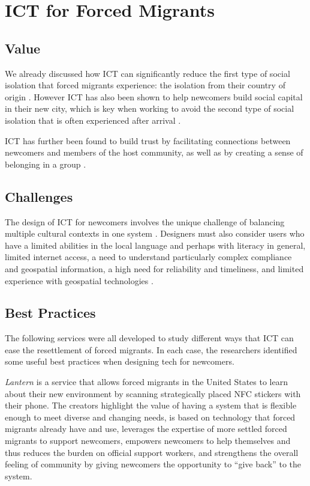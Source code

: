 \section{ICT for Forced Migrants}
\label{sec:ict}


\subsection*{Value}

We already discussed how ICT can significantly reduce the first type of social isolation that forced migrants experience: the isolation from their country of origin \cite{harney_precarity_2013}. However ICT has also been shown to help newcomers build social capital in their new city, which is key when working to avoid the second type of social isolation that is often experienced after arrival \cite{alam_digital_2015}.

ICT has further been found to build trust by facilitating connections between newcomers and members of the host community, as well as by creating a sense of belonging in a group \cite{almohamed_vulnerability_2016}.


\subsection*{Challenges}

The design of ICT for newcomers involves the unique challenge of balancing multiple cultural contexts in one system \cite{almohamed_designing_2016}. Designers must also consider users who have a limited abilities in the local language and perhaps with literacy in general, limited internet access, a need to understand particularly complex compliance and geospatial information, a high need for reliability and timeliness, and limited experience with geospatial technologies \cite{bustamante_duarte_exploring_2018}.


\subsection*{Best Practices}

The following services were all developed to study different ways that ICT can ease the resettlement of forced migrants. In each case, the researchers identified some useful best practices when designing tech for newcomers.

\textit{Lantern} \cite{baranoff_lantern:_2015} is a service that allows forced migrants in the United States to learn about their new environment by scanning strategically placed NFC stickers with their phone. The creators highlight the value of having a system that is flexible enough to meet diverse and changing needs, is based on technology that forced migrants already have and use, leverages the expertise of more settled forced migrants to support newcomers, empowers newcomers to help themselves and thus reduces the burden on official support workers, and strengthens the overall feeling of community by giving newcomers the opportunity to ``give back'' to the system.

